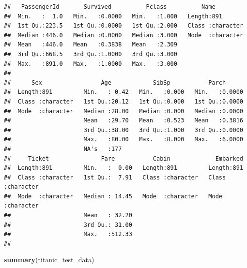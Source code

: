 \documentclass[
]{article}
\newenvironment{Shaded}{\begin{snugshade}}{\end{snugshade}}
\newcommand{\FunctionTok}[1]{\textcolor[rgb]{0.13,0.29,0.53}{\textbf{#1}}}
\newcommand{\NormalTok}[1]{#1}
\begin{document}
\begin{verbatim}
##   PassengerId       Survived          Pclass          Name          
##  Min.   :  1.0   Min.   :0.0000   Min.   :1.000   Length:891        
##  1st Qu.:223.5   1st Qu.:0.0000   1st Qu.:2.000   Class :character  
##  Median :446.0   Median :0.0000   Median :3.000   Mode  :character  
##  Mean   :446.0   Mean   :0.3838   Mean   :2.309                     
##  3rd Qu.:668.5   3rd Qu.:1.0000   3rd Qu.:3.000                     
##  Max.   :891.0   Max.   :1.0000   Max.   :3.000                     
##                                                                     
##      Sex                 Age            SibSp           Parch       
##  Length:891         Min.   : 0.42   Min.   :0.000   Min.   :0.0000  
##  Class :character   1st Qu.:20.12   1st Qu.:0.000   1st Qu.:0.0000  
##  Mode  :character   Median :28.00   Median :0.000   Median :0.0000  
##                     Mean   :29.70   Mean   :0.523   Mean   :0.3816  
##                     3rd Qu.:38.00   3rd Qu.:1.000   3rd Qu.:0.0000  
##                     Max.   :80.00   Max.   :8.000   Max.   :6.0000  
##                     NA's   :177                                     
##     Ticket               Fare           Cabin             Embarked        
##  Length:891         Min.   :  0.00   Length:891         Length:891        
##  Class :character   1st Qu.:  7.91   Class :character   Class :character  
##  Mode  :character   Median : 14.45   Mode  :character   Mode  :character  
##                     Mean   : 32.20                                        
##                     3rd Qu.: 31.00                                        
##                     Max.   :512.33                                        
## 
\end{verbatim}

\begin{Shaded}
\begin{Highlighting}[]
\FunctionTok{summary}\NormalTok{(titanic\_test\_data)}
\end{Highlighting}
\end{Shaded}
\end{document}
